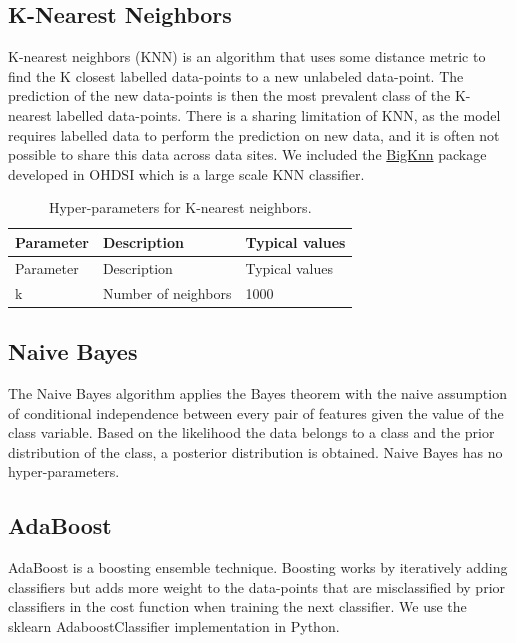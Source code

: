 \documentclass[11pt]{book}
\theoremstyle{definition}
\theoremstyle{definition}
\theoremstyle{definition}
\theoremstyle{remark}
\begin{document}
\subsection{K-Nearest Neighbors}\label{k-nearest-neighbors}

K-nearest neighbors (KNN) is an algorithm that uses some distance metric
to find the K closest labelled data-points to a new unlabeled
data-point. The prediction of the new data-points is then the most
prevalent class of the K-nearest labelled data-points. There is a
sharing limitation of KNN, as the model requires labelled data to
perform the prediction on new data, and it is often not possible to
share this data across data sites. We included the
\href{https://github.com/OHDSI/BigKnn}{BigKnn} package developed in
OHDSI which is a large scale KNN classifier. 

\begin{longtable}[]{@{}lll@{}}
\caption{\label{tab:knnParameters} Hyper-parameters for K-nearest
neighbors.}\tabularnewline
\toprule
Parameter & Description & Typical values\tabularnewline
\midrule
\endfirsthead
\toprule
Parameter & Description & Typical values\tabularnewline
\midrule
\endhead
k & Number of neighbors & 1000\tabularnewline
\bottomrule
\end{longtable}

\subsection{Naive Bayes}\label{naive-bayes}

The Naive Bayes algorithm applies the Bayes theorem with the naive
assumption of conditional independence between every pair of features
given the value of the class variable. Based on the likelihood the data
belongs to a class and the prior distribution of the class, a posterior
distribution is obtained. Naive Bayes has no hyper-parameters.

\subsection{AdaBoost}\label{adaboost}

AdaBoost is a boosting ensemble technique. Boosting works by iteratively
adding classifiers but adds more weight to the data-points that are
misclassified by prior classifiers in the cost function when training
the next classifier. We use the sklearn AdaboostClassifier
implementation in Python.  
\end{document}
